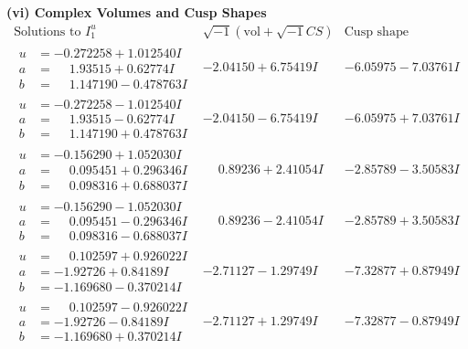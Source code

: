 \documentclass[1p]{elsarticle_modified}
\theoremstyle{definition}
\newcommand{\I}{\sqrt{-1}}
\begin{document}
\newpage\flushleft \textbf{(vi) Complex Volumes and Cusp Shapes}
$$\begin{array}{c|c|c}  
\text{Solutions to }I^u_{1}& \I (\text{vol} + \sqrt{-1}CS) & \text{Cusp shape}\\
 \hline 
\begin{aligned}
u &= -0.272258 + 1.012540 I \\
a &= \phantom{-}1.93515 + 0.62774 I \\
b &= \phantom{-}1.147190 - 0.478763 I\end{aligned}
 & -2.04150 + 6.75419 I & -6.05975 - 7.03761 I \\ \hline\begin{aligned}
u &= -0.272258 - 1.012540 I \\
a &= \phantom{-}1.93515 - 0.62774 I \\
b &= \phantom{-}1.147190 + 0.478763 I\end{aligned}
 & -2.04150 - 6.75419 I & -6.05975 + 7.03761 I \\ \hline\begin{aligned}
u &= -0.156290 + 1.052030 I \\
a &= \phantom{-}0.095451 + 0.296346 I \\
b &= \phantom{-}0.098316 + 0.688037 I\end{aligned}
 & \phantom{-}0.89236 + 2.41054 I & -2.85789 - 3.50583 I \\ \hline\begin{aligned}
u &= -0.156290 - 1.052030 I \\
a &= \phantom{-}0.095451 - 0.296346 I \\
b &= \phantom{-}0.098316 - 0.688037 I\end{aligned}
 & \phantom{-}0.89236 - 2.41054 I & -2.85789 + 3.50583 I \\ \hline\begin{aligned}
u &= \phantom{-}0.102597 + 0.926022 I \\
a &= -1.92726 + 0.84189 I \\
b &= -1.169680 - 0.370214 I\end{aligned}
 & -2.71127 - 1.29749 I & -7.32877 + 0.87949 I \\ \hline\begin{aligned}
u &= \phantom{-}0.102597 - 0.926022 I \\
a &= -1.92726 - 0.84189 I \\
b &= -1.169680 + 0.370214 I\end{aligned}
 & -2.71127 + 1.29749 I & -7.32877 - 0.87949 I \\ \hline\begin{aligned}

\end{aligned}
\end{array}$$
\end{document}
